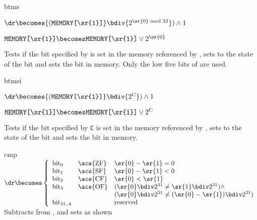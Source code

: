 \begin{instruction}{btms}
    {$\dr \becomes {(\texttt{MEMORY[\sr{1}]}} \bdiv {2^{\sr{0} \bmod 32}}) \wedge  1$

     $\texttt{MEMORY[\sr{1}]} \becomes \texttt{MEMORY[\sr{1}]} \vee {2^{\textrm{\sr{0}}}}$}
    {Tests if the bit specified by  is set in the memory
      referenced by , sets \dr to the state of the bit and
      sets the bit in memory.  Only the low five bits of 
      are used.}
\end{instruction}


\begin{instruction}{btmsi}
    {$\dr \becomes {(\texttt{MEMORY[\sr{1}]}} \bdiv {2^{\textrm{C}}}) \wedge  1$

     $\texttt{MEMORY[\sr{1}]} \becomes \texttt{MEMORY[\sr{1}]} \vee {2^{\textrm{C}}}$}
    {Tests if the bit specified by \texttt{C} is set in the memory
      referenced by , sets \dr to the state of the bit and
      sets the bit in memory.}
\end{instruction}


%
%

\begin{instruction}{cmp}\label{inst:cmp}
  {
    \begin{math}
      \dr \becomes \left\lbrace\begin{array}{lll}
      \textrm{bit}_0 & \textrm{\acs{ZF}} & \sr{0} - \sr{1} = 0 \\
      \textrm{bit}_1 & \textrm{\acs{SF}} & \sr{0} - \sr{1} < 0 \\
      \textrm{bit}_2 & \textrm{\acs{CF}} & \sr{0} < \sr{1} \\
      \textrm{bit}_3 & \textrm{\acs{OF}} &
      (\sr{0} \bdiv 2^{31} \neq \sr{1} \bdiv 2^{31}) \wedge \\
      & & (\sr{0} \bdiv 2^{31} \neq (\sr{0} - \sr{1}) \bdiv 2^{31}) \\
      \textrm{bit}_{31..4} & & \textrm{reserved} \\
      \end{array}
      \right.
    \end{math}
  }
  {
    Subtracts  from , and sets \dr as shown
  }

\end{instruction}


